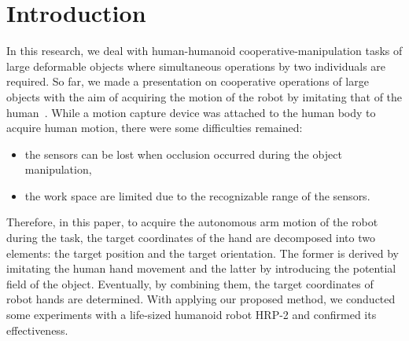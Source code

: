 \section{Introduction}
In this research, we deal with human-humanoid cooperative-manipulation tasks of large deformable objects where simultaneous operations by two individuals are required. So far, we made a presentation on cooperative operations of large objects with the aim of acquiring the motion of the robot by imitating that of the human~\cite{h-ito:ROBOMEC2018}. While a motion capture device was attached to the human body to acquire human motion, there were some difficulties remained:
\begin{itemize}
  \item the sensors can be lost when occlusion occurred during the object manipulation,
  \item the work space are limited due to the recognizable range of the sensors.
\end{itemize}

Therefore, in this paper, to acquire the autonomous arm motion of the robot during the task, the target coordinates of the hand are decomposed into two elements: the target position and the target orientation. The former is derived by imitating the human hand movement and the latter by introducing the potential field of the object. Eventually, by combining them, the target coordinates of robot hands are determined. With applying our proposed method, we conducted some experiments with a life-sized humanoid robot HRP-2 and confirmed its effectiveness.

